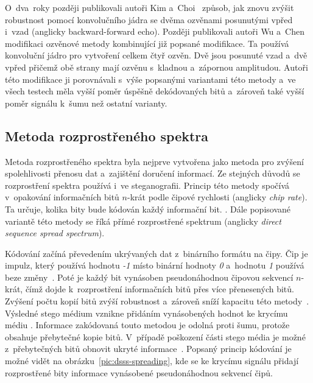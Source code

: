 O~dva~roky později publikovali autoři Kim a~Choi~\cite{Kim2003} způsob, jak
znovu zvýšit robustnost pomocí konvolučního jádra se dvěma ozvěnami posunutými
vpřed i~vzad (anglicky backward-forward echo). Později publikovali autoři Wu
a~Chen \cite{Wu2006} modifikaci ozvěnové metody kombinující již popsané
modifikace. Ta používá konvoluční jádro pro vytvoření celkem čtyř ozvěn. Dvě
jsou posunuté vzad a~dvě vpřed přičemž obě strany mají ozvěnu s~kladnou
a~zápornou amplitudou. Autoři této modifikace ji porovnávali s~výše popsanými
variantami této metody a~ve všech testech měla vyšší poměr úspěšně dekódovaných
bitů a~zároveň také vyšší poměr signálu k~šumu než ostatní varianty.

\subsection*{Metoda rozprostřeného spektra}
\label{sub:dsss}

Metoda rozprostřeného spektra byla nejprve vytvořena jako metoda pro zvýšení
spolehlivosti přenosu dat a~zajištění doručení informací. Ze stejných důvodů se
rozprostření spektra používá i~ve steganografii. Princip této metody spočívá
v~opakování informačních bitů $n$-krát podle čipové rychlosti (anglicky
\textit{chip rate}). Ta určuje, kolika bity bude kódován každý informační bit.
\cite{AlSabhany2020}. Dále popisované variantě této metody se říká přímé
rozprostřené spektrum (anglicky \textit{direct sequence spread spectrum}).

Kódování začíná převedením ukrývaných dat z~binárního formátu na čipy. Čip je
impulz, který používá hodnotu \textit{-1} místo binární hodnoty \textit{0}
a~hodnotu \textit{1} používá beze změny~\cite{Kuznetsov2022}. Poté je každý bit
vynásoben pseudonáhodnou čipovou sekvencí $n$-krát, čímž dojde k~rozprostření
informačních bitů přes více přenesených bitů. Zvýšení počtu kopií bitů zvýší
robustnost a~zároveň sníží kapacitu této metody~\cite{AlSabhany2020}. Výsledné
stego médium vznikne přidáním vynásobených hodnot ke krycímu médiu
\cite{Kuznetsov2022}. Informace zakódovaná touto metodou je odolná proti šumu,
protože obsahuje přebytečné kopie bitů. V~případě poškození části stego média
je možné z~přebytečných bitů obnovit ukryté informace~\cite{Djebbar2012}.
Popsaný princip kódování je možné vidět na obrázku~\ref{pic:dsss-spreading},
kde se ke krycímu signálu přidají rozprostřené bity informace vynásobené
pseudonáhodnou sekvencí čipů.

